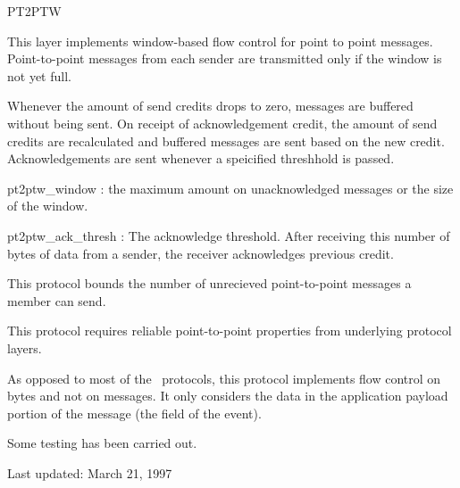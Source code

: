 %
%
%
\begin{Layer}{PT2PTW} 

This layer implements window-based flow control for point to point messages.
Point-to-point messages from each sender are transmitted only if the window is
not yet full.

\begin{Protocol}
Whenever the amount of send credits drops to zero, messages are buffered
without being sent.  On receipt of acknowledgement credit, the amount of send
credits are recalculated and buffered messages are sent based on the new
credit.  Acknowledgements are sent whenever a speicified threshhold is passed.
\end{Protocol}

\begin{Parameters}
\item pt2ptw\_window : the maximum amount on unacknowledged messages or the size of the
window.
\item pt2ptw\_ack\_thresh : The acknowledge threshold.  After receiving this
number of bytes of data from a sender, the receiver acknowledges previous
credit.
\end{Parameters}

\begin{Properties}
\item
This protocol bounds the number of unrecieved point-to-point messages a member
can send.
\item
This protocol requires reliable point-to-point properties from underlying
protocol layers.
\end{Properties}

\begin{Notes}
\item
As opposed to most of the \ensemble\ protocols, this protocol implements flow
control on bytes and not on messages.  It only considers the data in the
application payload portion of the message (the  field of the
event).
\end{Notes}

\begin{Sources}
\end{Sources}

\begin{Testing}
\item
Some testing has been carried out.
\end{Testing}

Last updated: March 21, 1997

\end{Layer}
